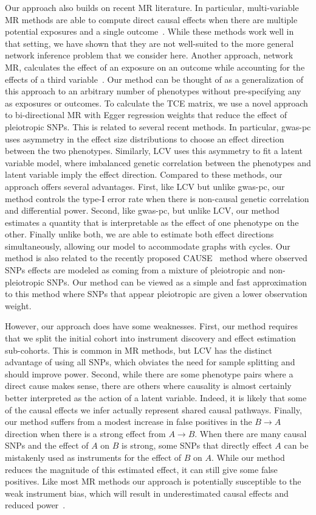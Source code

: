 \documentclass{article}
\begin{document}
Our approach also builds on recent MR literature. In particular, multi-variable MR
methods are able to compute direct causal effects when there
are multiple potential exposures and a single outcome~\cite{Zuber2020,Burgess2015a}. While
these methods work well in that setting, we have shown that they are not well-suited
to the more general network inference problem that we consider here. Another approach, network
MR, calculates the effect of an exposure on an outcome while
accounting for the effects of a third variable~\cite{Burgess2015}. Our method can
be thought of as a generalization of this approach to an arbitrary number of phenotypes
without pre-specifying any as exposures or outcomes. To calculate the TCE matrix, we use
a novel approach to bi-directional MR with Egger regression weights that reduce the effect
of pleiotropic SNPs. This is related to several recent methods.
In particular, gwas-pc uses asymmetry in the effect size distributions
to choose an effect direction between the two phenotypes. Similarly, 
LCV uses this asymmetry to fit a latent variable model, where imbalanced
genetic correlation between the phenotypes and latent variable imply
the effect direction. Compared to these methods, our approach offers several
advantages. First, like LCV but unlike gwas-pc, our method controls the type-I error rate
when there is non-causal genetic correlation and differential power. Second, like gwas-pc,
but unlike LCV, our method estimates a quantity that is interpretable as the
effect of one phenotype on the other. Finally unlike both,
we are able to estimate both effect directions simultaneously, allowing our
model to accommodate graphs with cycles. Our method is also related to the
recently proposed CAUSE~\cite{Morrison2020} method where observed SNPs effects are modeled
as coming from a mixture of pleiotropic and non-pleiotropic SNPs. Our method can be viewed as
a simple and fast approximation to this method where SNPs that appear pleiotropic are given a lower
observation weight.

However, our approach does have some weaknesses. First, our method
requires that we split the initial cohort into instrument discovery and
effect estimation sub-cohorts. This is common in MR methods, but LCV has
the distinct advantage of using all SNPs, which obviates the need
for sample splitting and should improve power. Second, while there are some
phenotype pairs where a direct cause makes sense, there are others where causality is 
almost certainly better interpreted as the action of a latent variable. Indeed, it is likely
that some of the causal effects we infer actually represent shared causal pathways.
Finally, our method suffers from a modest increase in false positives in the $B\rightarrow A$
direction when there is a strong effect from $A\rightarrow B$. When there are many
causal SNPs and the effect of $A$ on $B$ is strong, some SNPs that directly effect $A$
can be mistakenly used as instruments for the effect of $B$ on $A$. While our method
reduces the magnitude of this estimated effect, it can still give some false positives.
Like most MR methods our approach is potentially susceptible to the weak instrument bias, which will result in  underestimated
causal effects and reduced power~\cite{Davies2015}.
\end{document}
